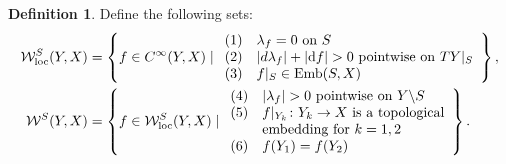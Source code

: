 \documentclass[pdftex]{sigma}
\numberwithin{equation}{section}
\theoremstyle{definition}
\newtheorem{Definition}[Theorem]{Definition}
\newcommand{\1}{{\bf 1}}
\newcommand{\loc}{\mathrm{loc}}
\begin{document}
\begin{Definition}\label{def_whitney} Define the following sets:
\begin{align*}
	\mathcal W_\loc^S(Y,X)&= \left\{f\in C^\infty(Y,X)\mid \begin{array}{ll}{\rm (1)}&\lambda_f=0 \text{ on } S\\
	 {\rm (2)}&|d\lambda_f| + |{\rm d}f| > 0 \text{ pointwise on } TY|_S \\
	 {\rm (3)}&f|_S\in \operatorname{Emb}(S,X)
	 \end{array}\right\},\\
	 \mathcal W^S(Y,X) &=\left\{f\in \mathcal W^S_\loc(Y,X)\mid \begin{array}
{ll}
 {\rm (4) } & |\lambda_f|>0\text{ pointwise on } Y\backslash S\\
{\rm (5)}& f|_{Y_k}\colon Y_k \to X \text{ is a topological}\\
	 &\text{embedding for } k=1,2\\
	 {\rm (6)}&f(Y_1)=f(Y_2)
	 \end{array}\right\}.
\end{align*}
\end{Definition}
\end{document}
